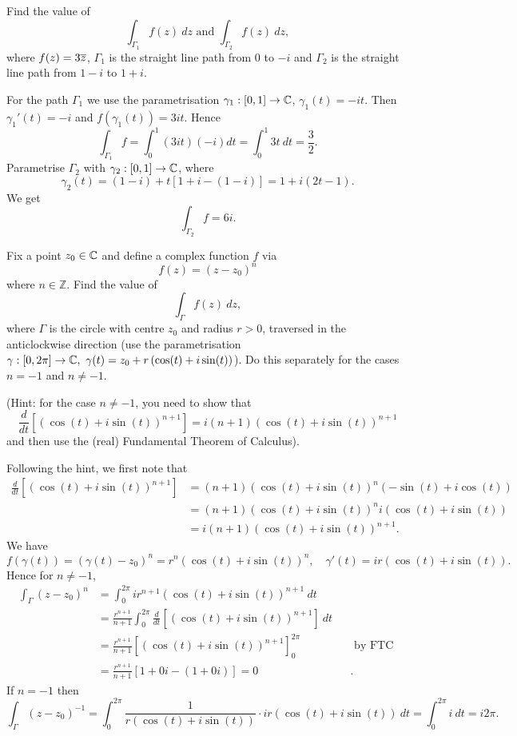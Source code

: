 \begin{questions}
\begin{answer}
\end{answer}
\question Find the value of
\[
\int_{\Gamma_1} f(z)\ dz \text{ and } \int_{\Gamma_2} f(z)\ dz,
\]
where $f(z) = 3 \overline{z}$, $\Gamma_1$ is the straight line path from $0$ to $-i$ and $\Gamma_2$ is the straight line path from $1-i$ to $1+i$.
\begin{answer}
For the path $\Gamma_1$ we use the parametrisation $\gamma_1:[0,1] \to \mathbb{C}$, $\gamma_1 (t) = -it.$  Then $\gamma_1'(t)=-i$ and $f(\gamma_1(t)) = 3it$.  Hence
\[
\int_{\Gamma_1} f = \int_0^1 (3it)(-i)dt = \int_0^1 3t\ dt = \frac{3}{2}.
\]
Parametrise $\Gamma_2$ with $\gamma_2:[0,1] \to \mathbb{C}$, where
\[
\gamma_2 (t) = (1-i) + t \left[ 1+i-(1-i) \right] = 1+i(2t-1).
\]
We get
\[
\int_{\Gamma_2} f = 6i.
\]
\end{answer}





\question Fix a point $z_0 \in \mathbb{C}$ and define a complex function $f$ via
\[
f(z) = (z-z_0)^n
\]
where $n \in \mathbb{Z}$.  Find the value of
\[
\int_{\Gamma} f(z)\ dz,
\]
where $\Gamma$ is the circle with centre $z_0$ and radius $r>0$, traversed in the anticlockwise direction (use the parametrisation $\gamma:[0,2\pi] \to \mathbb{C}, \ \gamma (t) = z_0 + r \left( \cos (t) + i \sin (t) \right)$).  Do this separately for the cases $n=-1$ and $n \neq -1$.

(Hint: for the case $n \neq -1$, you need to show that
\[
\frac{d}{dt} \left[ \left( \cos(t)+i \sin(t) \right)^{n+1} \right] = i(n+1) \left( \cos(t)+i \sin(t) \right)^{n+1}
\]
and then use the (real) Fundamental Theorem of Calculus).
\begin{answer}
Following the hint, we first note that
\begin{align*}
\frac{d}{dt} \left[ \left( \cos(t)+i \sin(t) \right)^{n+1} \right] & = (n+1) \left( \cos(t)+i \sin(t) \right)^{n} \left( - \sin (t)+i \cos(t) \right) \\
& = (n+1) \left( \cos(t)+i \sin(t) \right)^{n} i \left( \cos(t)+i \sin(t) \right) \\
& = i(n+1) \left( \cos(t)+i \sin(t) \right)^{n+1}.
\end{align*}
We have
\[
f(\gamma(t))=\left( \gamma(t)-z_0 \right)^n = r^n \left( \cos (t)+i \sin (t) \right)^n,\quad \gamma'(t) = i r\left( \cos(t) + i \sin (t) \right).
\]
Hence for $n \neq -1$,
\begin{align*}
\int_{\Gamma} (z-z_0)^n & = \int_0^{2\pi} i r^{n+1} \left( \cos(t) + i \sin (t) \right)^{n+1}\ dt &&\\
& = \frac{r^{n+1}}{n+1} \int_0^{2\pi} \frac{d}{dt} \left[ \left( \cos(t) + i \sin (t) \right)^{n+1} \right]\ dt && \\
& = \frac{r^{n+1}}{n+1} \left[ \left( \cos(t) + i \sin (t) \right)^{n+1} \right]_0^{2\pi} && \text{ by FTC }\\
& = \frac{r^{n+1}}{n+1} \left[ 1+0i-(1+0i) \right] = 0 &&.
\end{align*}
If $n=-1$ then
\[
\int_{\Gamma} (z- z_0)^{-1} = \int_0^{2\pi} \frac{1}{r(\cos(t)+i\sin(t) )} \cdot ir (\cos(t)+i\sin(t) )\ dt =  \int_0^{2\pi} i\ dt = i2\pi.
\]



\end{answer}
\end{questions}

